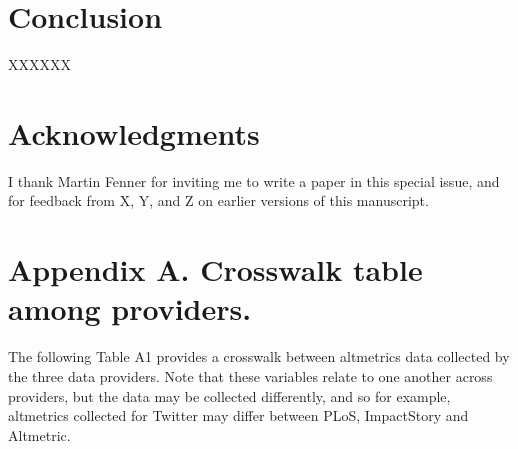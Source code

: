 \documentclass[letterpaper,superscriptaddress,showkeys,longbibliography]{revtex4-1}\usepackage{graphicx, color}
\begin{document}
\section{Conclusion}

XXXXXX

\section{Acknowledgments}

I thank Martin Fenner for inviting me to write a paper in this special issue, and for feedback from X, Y, and Z on earlier versions of this manuscript.



\section{Appendix A. Crosswalk table among providers.}

The following Table A1 provides a crosswalk between altmetrics data collected by the three data providers. Note that these variables relate to one another across providers, but the data may be collected differently, and so for example, altmetrics collected for Twitter may differ between PLoS, ImpactStory and Altmetric.
\end{document}
